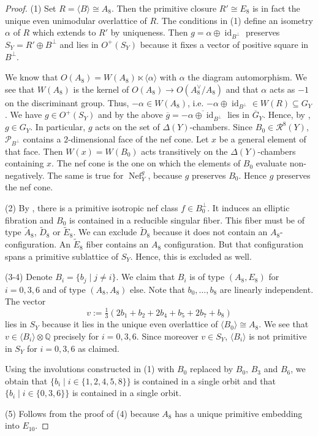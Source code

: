 \documentclass[a4paper]{amsart}
\theoremstyle{definition}
\theoremstyle{plain}
\DeclareMathOperator{\Nef}{Nef}
\DeclareMathOperator{\id}{id}
\newcommand{\QQ}{\mathbb{Q}}
\renewcommand{\P}{\mathcal{P}}
\newcommand{\R}{\mathcal{R}}
\newcommand{\Gbar}{\overline{G}}
\begin{document}
\begin{proof}
(1) Set $R= \langle B \rangle \cong A_8$. Then the primitive closure $R' \cong E_{8}$ is in fact the unique even unimodular overlattice of $R$. The conditions in (1) define an isometry $\alpha$ of $R$ which extends to $R'$ by uniqueness. Then $g=\alpha \oplus \id_{B^\perp}$ preserves $S_Y=R'\oplus B^\perp$ and lies in $O^+(S_Y)$ because it fixes a vector of positive square in $B^\perp$.

We know that $O(A_8)=W(A_8)\ltimes \langle \alpha \rangle$ with $\alpha$ the diagram automorphism. 
We see that $W(A_8)$ is the kernel of $O(A_8)\to O(A_8^\vee/A_8)$ and that $\alpha$ acts as $-1$ on the discriminant group.  
Thus, $-\alpha \in W(A_8)$, i.e. $-\alpha \oplus \id_{B^\perp} \in W(R)\subseteq G_Y$. We have $g \in O^+(S_Y)$ 
and by the above $\overline{g}=\overline{-\alpha\oplus \id_{B^\perp}}$ lies in $\Gbar_Y$. Hence, by , $g \in G_Y$. 
In particular, $g$ acts on the set of $\Delta(Y)$-chambers. 
Since $B_0\in \R^{8}(Y)$, $\P_{B^\perp}$ contains a $2$-dimensional face of the nef cone. Let $x$ be a general element of that face. 
Then $W(x)=W(B_0)$ acts transitively on the $\Delta(Y)$-chambers containing $x$. The nef cone is the one on which the elements of $B_0$ evaluate non-negatively. The same is true for $\Nef_Y^g$, because $g$ preserves $B_0$.
Hence $g$ preserves the nef cone. 

(2) By , there is a primitive isotropic nef class $f \in B_0^\perp$. It induces an elliptic fibration and $B_0$ is contained in a reducible singular fiber. This fiber must be of type $\widetilde{A}_8$, $\widetilde{D}_8$ or $\widetilde{E}_8$. We can exclude $\widetilde{D}_8$ because it does not contain an $A_8$-configuration. An $\widetilde{E}_8$ fiber contains an $A_8$ configuration. But that configuration spans a primitive sublattice of $S_Y$. Hence, this is excluded as well. 

(3-4) Denote $B_i = \{b_j \mid j \neq i\}$. We claim that $B_i$ is of type $(A_8,E_8)$ for $i=0,3,6$ and of type $(A_8,A_8)$ else. Note that $b_0,\dots, b_8$ are linearly independent.
The vector 
\[v :=\tfrac{1}{3}(2 b_1+b_2+2b_4+b_5+2b_7+b_8)\]
lies in $S_Y$ because it lies in the unique even overlattice of $\langle B_0 \rangle  \cong A_8$.
We see that $v \in \langle B_i \rangle \otimes \QQ$ precisely for $i=0,3,6$. Since moreover $v \in S_Y$, $\langle B_i \rangle$ is not primitive in $S_Y$ for $i=0,3,6$ as claimed.

Using the involutions constructed in (1) with $B_0$ replaced by $B_0$, $B_3$ and $B_6$, we obtain that 
$\{b_i \mid i \in \{1,2,4,5,8\}\}$ is contained in a single orbit and that 
$\{b_i \mid i \in \{0,3,6\}\}$ is contained in a single orbit.

(5) Follows from the proof of (4) because $A_8$ has a unique primitive embedding into $E_{10}$.
\end{proof}
\end{document}
